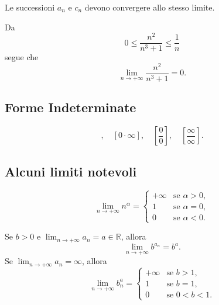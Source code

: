 \begin{remark}
    Le successioni $a_n$ e $c_n$ devono convergere allo stesso limite.
\end{remark}

\begin{example}
    Da
    \begin{equation*}
        0\leq \frac{n^2}{n^3+1}\leq\frac{1}{n}
    \end{equation*}
    segue che
    \begin{equation*}
        \lim_{n\rightarrow+\infty}\frac{n^2}{n^3+1}=0.
    \end{equation*}
\end{example}

\subsection{Forme Indeterminate}
\begin{definition}
    \begin{equation*}
        [\infty - \infty],\quad [0\cdot\infty],\quad\left[\frac{0}{0}\right],\quad\left[\frac{\infty}{\infty}\right].
    \end{equation*}
\end{definition}

\subsection{Alcuni limiti notevoli}
\begin{proposition}
    \begin{equation*}
        \lim_{n\rightarrow+\infty}n^\alpha=
        \begin{cases}
            +\infty & \text{se } \alpha>0,\\
            1 &\text{se } \alpha = 0,\\
            0 &\text{se } \alpha<0.
        \end{cases}
    \end{equation*}
\end{proposition}

\begin{proposition}
    Se $b>0$ e $\lim_{n\rightarrow+\infty}a_n=a\in\mathbb R$, allora
    \begin{equation*}
        \lim_{n\rightarrow+\infty} b^{a_n}=b^a.
    \end{equation*}
    Se $\lim_{n\rightarrow+\infty}a_n =\infty$, allora
    \begin{equation*}
        \lim_{n\rightarrow+\infty}b^a_n=
        \begin{cases}
            +\infty & \text{se } b>1,\\
            1 &\text{se } b = 1,\\
            0 &\text{se } 0<b<1.
        \end{cases}
    \end{equation*}
\end{proposition}

